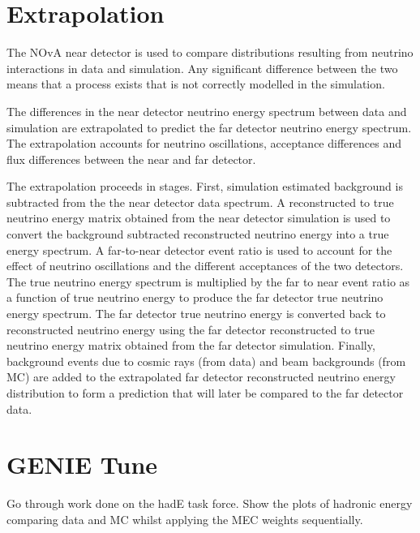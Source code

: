 \section{Extrapolation}\label{sec:extrap}
The NOvA near detector is used to compare distributions resulting from
neutrino interactions in data and simulation. Any significant
difference between the two means that a process exists that is not
correctly modelled in the simulation. 

The differences in the near detector neutrino energy spectrum between
data and simulation are extrapolated to predict the far detector
neutrino energy spectrum. The extrapolation accounts for neutrino
oscillations, acceptance differences and flux differences between the
near and far detector. 

The extrapolation proceeds in stages. 
First, simulation estimated background is subtracted from the the near
detector data spectrum.  
A reconstructed to true neutrino energy matrix obtained from the near
detector simulation is used to convert the background subtracted
reconstructed neutrino energy into a true energy spectrum. 
A far-to-near detector event ratio is used to account for the effect
of neutrino oscillations and the different acceptances of the two
detectors.
The true neutrino energy spectrum is multiplied by the far to near
event ratio as a function of true neutrino energy to produce the far
detector true neutrino energy spectrum.  The far detector
true neutrino energy is converted back to reconstructed
neutrino energy using the far detector reconstructed to true neutrino
energy matrix obtained from the far detector simulation. 
Finally, background events due to cosmic rays (from data) and beam
backgrounds (from MC) are added to the extrapolated far detector
reconstructed neutrino energy distribution to form a prediction that
will later be compared to the far detector data.
\cite{NOvASA}





\section{GENIE Tune}\label{sec:genietune}

Go through work done on the hadE task force. Show the plots of
hadronic energy comparing data and MC whilst applying the MEC weights
sequentially. 


